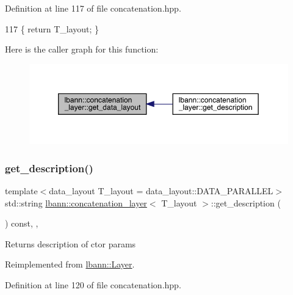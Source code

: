 Definition at line 117 of file concatenation.\+hpp.


\begin{DoxyCode}
117 \{ \textcolor{keywordflow}{return} T\_layout; \}
\end{DoxyCode}
Here is the caller graph for this function\+:\nopagebreak
\begin{figure}[H]
\begin{center}
\leavevmode
\includegraphics[width=350pt]{classlbann_1_1concatenation__layer_afa17d94708fe6d35db2925f664104d42_icgraph}
\end{center}
\end{figure}
\mbox{\label{classlbann_1_1concatenation__layer_a2154ad33b4bacbb5caed95fdebc735ca}} 
\subsubsection{\texorpdfstring{get\+\_\+description()}{get\_description()}}
{\footnotesize\ttfamily template$<$data\+\_\+layout T\+\_\+layout = data\+\_\+layout\+::\+D\+A\+T\+A\+\_\+\+P\+A\+R\+A\+L\+L\+EL$>$ \\
std\+::string \hyperlink{classlbann_1_1concatenation__layer}{lbann\+::concatenation\+\_\+layer}$<$ T\+\_\+layout $>$\+::get\+\_\+description (\begin{DoxyParamCaption}{ }\end{DoxyParamCaption}) const\hspace{0.3cm}{\ttfamily [inline]}, {\ttfamily [override]}, {\ttfamily [virtual]}}

Returns description of ctor params 

Reimplemented from \hyperlink{classlbann_1_1Layer_acc0803d3428914ca1eb5988c4309174a}{lbann\+::\+Layer}.



Definition at line 120 of file concatenation.\+hpp.


